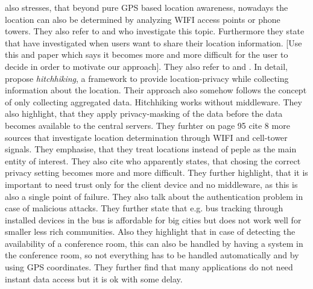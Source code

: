 \parencite{tang2006putting} also stresses, that beyond pure GPS based location awareness, nowadays the location can also be determined by analyzing WIFI access points or phone towers. They also refer to \parencite{lamarca2005place} and who investigate this topic. Furthermore they state that \parencite{consolvo2005location} have investigated when users want to share their location information. [Use this and paper which says it becomes more and more difficult for the user to decide in order to motivate our approach]. They also refer to \parencite{hong2004privacy} and \parencite{hong2004architecture}. In detail, \parencite{tang2006putting} propose \textit{hitchhiking}, a framework to provide location-privacy while collecting information about the location. Their approach also somehow follows the concept of only collecting aggregated data. Hitchhiking works without middleware. They also highlight, that they apply privacy-masking of the data before the data becomes available to the central servers. They furhter on page 95 cite 8 more sources that investigate location determination through WIFI and cell-tower signals. They emphasise, that they treat locations instead of peple as the main entity of interest. They also cite \parencite{palen2003unpacking} who apparently states, that chosing the correct privacy setting becomes more and more difficult. They further highlight, that it is important to need trust only for the client device and no middleware, as this is also a single point of failure. They also talk about the authentication problem in case of malicious attacks. They further state that e.g. bus tracking through installed devices in the bus is affordable for big cities but does not work well for smaller less rich communities. Also they highlight that in case of detecting the availability of a conference room, this can also be handled by having a system in the conference room, so not everything has to be handled automatically and by using GPS coordinates. They further find that many applications do not need instant data access but it is ok with some delay.

